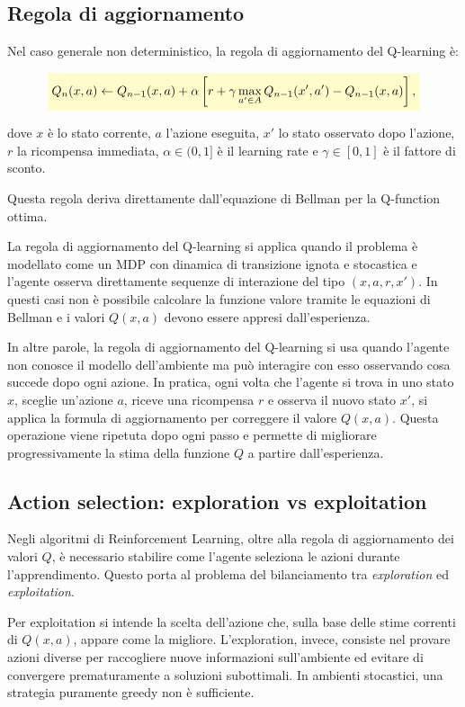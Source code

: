 \documentclass[a4paper,12pt]{report}
\newcommand{\highlight}[1]{%
\colorbox{yellow!20}{$\displaystyle #1$}%
}
\begin{document}
\subsection{Regola di aggiornamento}

Nel caso generale non deterministico, la regola di aggiornamento del
Q-learning è:

\[
\highlight{
Q_{n}(x,a) \leftarrow
Q_{n-1}(x,a) +
\alpha \left[
r + \gamma \max_{a' \in A} Q_{n-1}(x',a')
- Q_{n-1}(x,a)
\right],}
\]

dove $x$ è lo stato corrente, $a$ l'azione eseguita, $x'$ lo stato
osservato dopo l'azione, $r$ la ricompensa immediata,
$\alpha \in (0,1]$ è il learning rate e $\gamma \in [0,1]$ è il fattore
di sconto.

Questa regola deriva direttamente dall'equazione di Bellman per la
Q-function ottima.

La regola di aggiornamento del Q-learning si applica quando il problema è modellato come un MDP con dinamica di transizione ignota e stocastica e l’agente osserva direttamente sequenze di interazione del tipo $(x,a,r,x')$. In questi casi non è possibile calcolare la funzione valore tramite le equazioni di Bellman e i valori $Q(x,a)$ devono essere appresi dall’esperienza. 

In altre parole, la regola di aggiornamento del Q-learning si usa quando l’agente non conosce il modello dell’ambiente ma può interagire con esso osservando cosa succede dopo ogni azione. In pratica, ogni volta che l’agente si trova in uno stato $x$, sceglie un’azione $a$, riceve una ricompensa $r$ e osserva il nuovo stato $x'$, si applica la formula di aggiornamento per correggere il valore $Q(x,a)$. Questa operazione viene ripetuta dopo ogni passo e permette di migliorare progressivamente la stima della funzione $Q$ a partire dall’esperienza.


\subsection{Action selection: exploration vs exploitation}

Negli algoritmi di Reinforcement Learning, oltre alla regola di aggiornamento dei valori $Q$, è necessario stabilire come l’agente seleziona le azioni durante l’apprendimento. Questo porta al problema del bilanciamento tra \emph{exploration} ed \emph{exploitation}.

Per exploitation si intende la scelta dell’azione che, sulla base delle stime correnti di $Q(x,a)$, appare come la migliore. L’exploration, invece, consiste nel provare azioni diverse per raccogliere nuove informazioni sull’ambiente ed evitare di convergere prematuramente a soluzioni subottimali. In ambienti stocastici, una strategia puramente greedy non è sufficiente.
\end{document}
